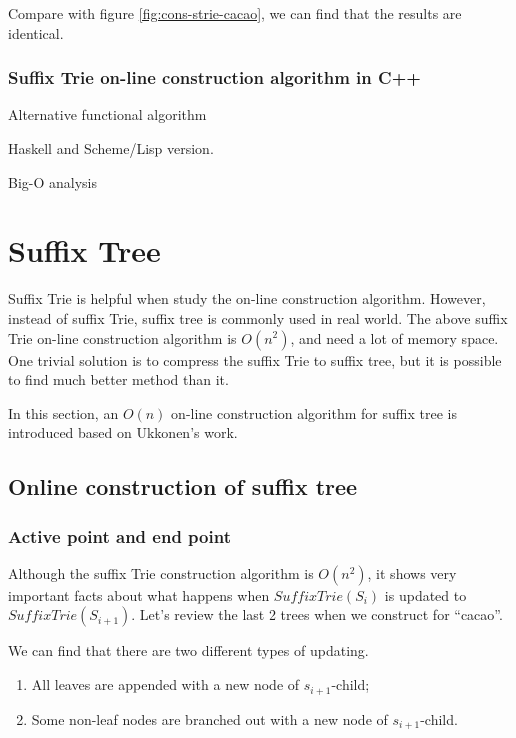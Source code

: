 \documentclass{article}
\begin{document}
Compare with figure \ref{fig:cons-strie-cacao}, we can find that the results are identical.

\subsubsection*{Suffix Trie on-line construction algorithm in C++}

Alternative functional algorithm

Haskell and Scheme/Lisp version.

Big-O analysis

\section{Suffix Tree} 

Suffix Trie is helpful when study the on-line construction algorithm.
However, instead of suffix Trie, suffix tree is commonly used in real world.
The above suffix Trie on-line construction algorithm is $O(n^2)$, and 
need a lot of memory space. One trivial solution is to compress the 
suffix Trie to suffix tree\cite{trivial-stree-java}, but it is possible
to find much better method than it.

In this section, an $O(n)$ on-line construction
algorithm for suffix tree is introduced based on Ukkonen's work\cite{ukkonen95}.

\subsection{Online construction of suffix tree} 

\subsubsection{Active point and end point}
\label{ap-and-ep}
Although the suffix Trie construction algorithm is $O(n^2)$, it shows very
important facts about what happens when $SuffixTrie(S_i)$ is updated to
$SuffixTrie(S_{i+1})$. Let's review the last 2 trees when we construct for
``cacao''.

We can find that there are two different types of updating.
\begin{enumerate}
\item All leaves are appended with a new node of $s_{i+1}$-child;
\item Some non-leaf nodes are branched out with a new node of $s_{i+1}$-child.
\end{enumerate}
\end{document}
